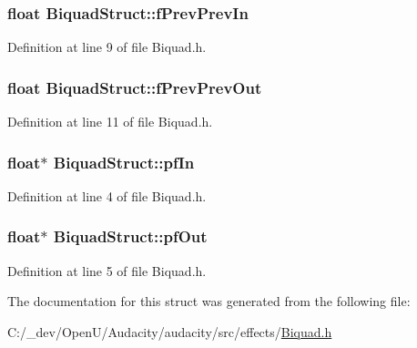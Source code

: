 \subsubsection[{\texorpdfstring{f\+Prev\+Prev\+In}{fPrevPrevIn}}]{\setlength{\rightskip}{0pt plus 5cm}float Biquad\+Struct\+::f\+Prev\+Prev\+In}\hypertarget{struct_biquad_struct_a2f3ff0651813fd285796a54473ef9a09}{}\label{struct_biquad_struct_a2f3ff0651813fd285796a54473ef9a09}


Definition at line 9 of file Biquad.\+h.

\subsubsection[{\texorpdfstring{f\+Prev\+Prev\+Out}{fPrevPrevOut}}]{\setlength{\rightskip}{0pt plus 5cm}float Biquad\+Struct\+::f\+Prev\+Prev\+Out}\hypertarget{struct_biquad_struct_a70a7d15cc371455fd9a815539b660b24}{}\label{struct_biquad_struct_a70a7d15cc371455fd9a815539b660b24}


Definition at line 11 of file Biquad.\+h.

\subsubsection[{\texorpdfstring{pf\+In}{pfIn}}]{\setlength{\rightskip}{0pt plus 5cm}float$\ast$ Biquad\+Struct\+::pf\+In}\hypertarget{struct_biquad_struct_a77ae80d26b2633521dd2bed08e7aae73}{}\label{struct_biquad_struct_a77ae80d26b2633521dd2bed08e7aae73}


Definition at line 4 of file Biquad.\+h.

\subsubsection[{\texorpdfstring{pf\+Out}{pfOut}}]{\setlength{\rightskip}{0pt plus 5cm}float$\ast$ Biquad\+Struct\+::pf\+Out}\hypertarget{struct_biquad_struct_ae11f685d35e5164ef2aa9373a78b851a}{}\label{struct_biquad_struct_ae11f685d35e5164ef2aa9373a78b851a}


Definition at line 5 of file Biquad.\+h.



The documentation for this struct was generated from the following file\+:\begin{DoxyCompactItemize}
\item 
C\+:/\+\_\+dev/\+Open\+U/\+Audacity/audacity/src/effects/\hyperlink{src_2effects_2_bi_quad_8h}{Biquad.\+h}\end{DoxyCompactItemize}
